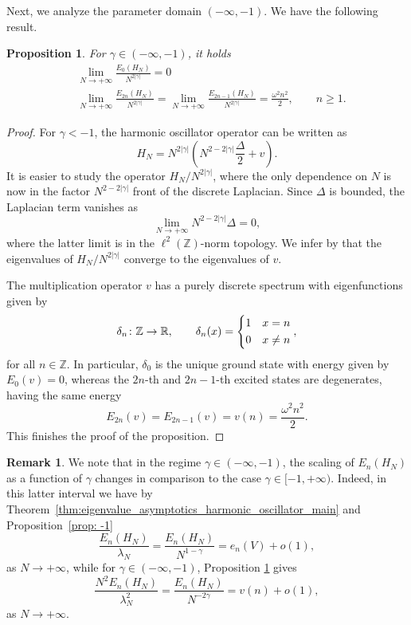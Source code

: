 \documentclass[12pt, reqno]{amsart}
\newtheorem{proposition}[theorem]{Proposition}
\theoremstyle{definition}
\newtheorem*{remark}{Remark}
\numberwithin{equation}{section}
\begin{document}
 Next, we analyze the parameter domain  $(-\infty, -1)$. We have the following result.
 \begin{proposition}\label{prop: -inf to -1}
 	For  $\gamma\in (-\infty, -1)$, it holds \begin{align*}
 		&\lim_{N\to+\infty} \frac{E_{0}(H_N)}{N^{2|\gamma|}}  = 0\\
 		&\lim_{N\to+\infty} \frac{E_{2n}(H_N)}{N^{2|\gamma|}} =  \lim_{N\to+\infty} \frac{E_{2n-1}(H_N)}{N^{2|\gamma|}} = \frac{\omega^2 n^2}{2},\qquad n\geq1.
 	\end{align*}
 \end{proposition} \begin{proof}
For $\gamma <-1$, the harmonic oscillator operator can be written as \begin{equation*}
	H_N = N^{2|\gamma|} \left( N^{2-2|\gamma|}\frac{\Delta}{2} + v\right).
\end{equation*} 
It is easier to study the operator $H_N/ N^{2|\gamma|}$, where the only dependence on $N$ is now in the factor $N^{2-2|\gamma|}$ front of the discrete Laplacian. Since $\Delta$ is bounded, the Laplacian term vanishes as\begin{equation*}
\lim_{N\to +\infty }N^{2-2|\gamma|}\Delta = 0,
\end{equation*} where the latter limit is in the $\ell^2(\mathbb{Z})$-norm topology. 
{
We infer by \cite[Chapter VIII, Theorem~3.6 \&~3.15]{Kato} that the eigenvalues of $H_N/N^{2|\gamma|}$ converge to the eigenvalues of $v$.}
 
 
 The multiplication operator $v$ has a purely discrete spectrum with eigenfunctions given by $$\delta_n \colon \mathbb{Z}\to\mathbb{R},\qquad \delta_n(x) = \begin{dcases}
	1 & x = n\\
	 0& x\neq n
\end{dcases},$$ for all $n\in\mathbb{Z}$. In particular, $\delta_0$ is the unique ground state with energy given by $E_0(v) = 0$, whereas the $2n$-th and $2n-1$-th excited states are degenerates, having the same energy $$E_{2n}(v) = E_{2n-1}(v) = v(n) = \frac{\omega^2 n^2}{2}. $$ 
This finishes the proof of the proposition.
 \end{proof} 
 
 \begin{remark}\label{rmk: change of scaling}
 We note that in the regime $\gamma\in (-\infty, -1)$, the scaling of $E_n(H_N)$ as a function of $\gamma$ changes in comparison to the case $\gamma\in[-1,+\infty)$. Indeed, in this latter interval we have by Theorem~\ref{thm:eigenvalue_asymptotics_harmonic_oscillator_main} and Proposition~\ref{prop: -1}
 \begin{equation*}
 	\frac{E_n(H_N)}{\lambda_N} = \frac{E_n(H_{N})}{N^{1-\gamma}} = e_n(V) + o(1),
 \end{equation*} as $N\to+\infty$, while for $\gamma\in (-\infty,-1)$, Proposition \ref{prop: -inf to -1} gives \begin{equation*}
\frac{ N^2 E_n(H_N)}{\lambda_N^2}  =  \frac{E_n(H_N)}{N^{-2\gamma }} = v(n) + o(1),
 \end{equation*}as $N\to+\infty$.
 \end{remark}
\end{document}
